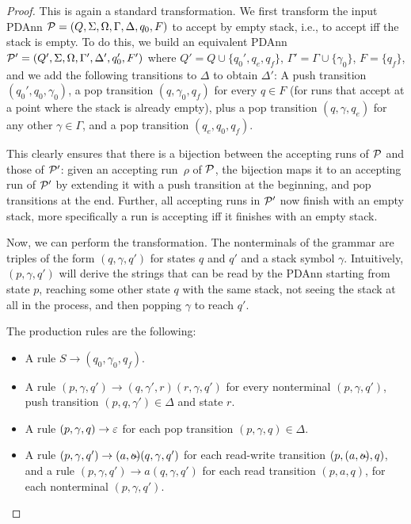 \begin{proof}
	This is again a standard transformation. We first transform the input PDAnn $\mathcal{P} = (Q, \Sigma, \Omega, \Gamma, \Delta, q_0, F)$ to
	accept by empty stack, i.e., to accept iff the stack is empty. To do this, we build an equivalent PDAnn $\mathcal{P}' = (Q', \Sigma, \Omega, \Gamma', \Delta', q_0', F')$ where $Q' = Q\cup\{q_0', q_e, q_f\}$, $\Gamma' = \Gamma \cup \{\gamma_0\}$, $F = \{q_f\}$, and we add the following transitions to $\Delta$ to obtain $\Delta'$: A push transition $(q_0', q_0, \gamma_0)$, a pop transition $(q, \gamma_0, q_f)$ for every $q\in F$ (for runs that accept at a point where the stack is already
	empty), plus a pop transition $(q, \gamma, q_e)$ for any other $\gamma\in\Gamma$, and a pop transition $(q_e, q_0, q_f)$.
	
	This clearly ensures that there is a bijection between the accepting runs of
	$\mathcal{P}$ and those of $\mathcal{P}'$: given an accepting run~$\rho$ of
	$\mathcal{P}$, the bijection maps it to an accepting run of $\mathcal{P}'$ by
	extending it with a push transition at the beginning, and pop transitions at
	the end. Further, all accepting runs in $\mathcal{P}'$ now finish with an empty
	stack, more specifically a run is accepting iff it finishes with an empty
	stack.
		
	Now, we can perform the transformation. The nonterminals of the grammar are
	triples of the form $(q, \gamma, q')$ for states $q$ and $q'$ and a stack symbol $\gamma$. Intuitively, $(p, \gamma, q')$ will derive the strings that can be
	read by the PDAnn starting from state $p$, reaching some other state $q$ with the same stack, not seeing the stack at all in the process, and then popping $\gamma$ to reach $q'$.
	
	The production rules are the following:
	
	\begin{itemize}
		\item A rule $S \to (q_0, \gamma_0, q_f)$.
		\item A rule $(p, \gamma, q') \rightarrow (q, \gamma', r)
		(r, \gamma, q')$ for every nonterminal $(p, \gamma, q')$, push transition $(p, q, \gamma')\in\Delta$ and state
		$r$.
		\item A rule $(p, \gamma, q)\to \varepsilon$ for each pop transition $(p, \gamma, q)\in \Delta$.
		\item A rule $(p, \gamma, q')\to (a, \oout) (q, \gamma, q')$ for each read-write transition $(p, (a, \oout), q)$, and a rule $(p, \gamma, q')\to a (q, \gamma, q')$ for each read transition $(p, a, q)$, for each nonterminal $(p, \gamma, q')$.
	\end{itemize}


\end{proof}
